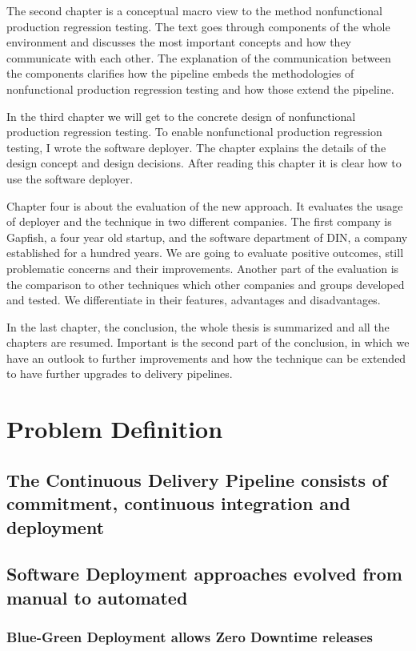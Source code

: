 The second chapter is a conceptual macro view to the method nonfunctional production
regression testing. The text goes through components of the whole environment and
discusses the most important concepts and how they communicate with each other. The
explanation of the communication between the components clarifies how the pipeline embeds
the methodologies of nonfunctional production regression testing and how those extend the
pipeline.

In the third chapter we will get to the concrete design of nonfunctional production
regression testing. To enable nonfunctional production regression testing, I wrote the
software deployer.  The chapter explains the details of the design concept and design
decisions. After reading this chapter it is clear how to use the software deployer.

Chapter four is about the evaluation of the new approach. It evaluates the usage of
deployer and the technique in two different companies. The first company is Gapfish, a
four year old startup, and the software department of DIN, a company established for a
hundred years. We are going to evaluate positive outcomes, still problematic concerns and
their improvements. Another part of the evaluation is the comparison to other techniques
which other companies and groups developed and tested. We differentiate in their features,
advantages and disadvantages.

In the last chapter, the conclusion, the whole thesis is summarized and all the chapters
are resumed. Important is the second part of the conclusion, in which we have an outlook
to further improvements and how the technique can be extended to have further upgrades to
delivery pipelines.

\chapter{Problem Definition}

\section{The Continuous Delivery Pipeline consists of commitment, continuous integration
and deployment}
\section{Software Deployment approaches evolved from manual to automated}
\subsection{Blue-Green Deployment allows Zero Downtime releases}

